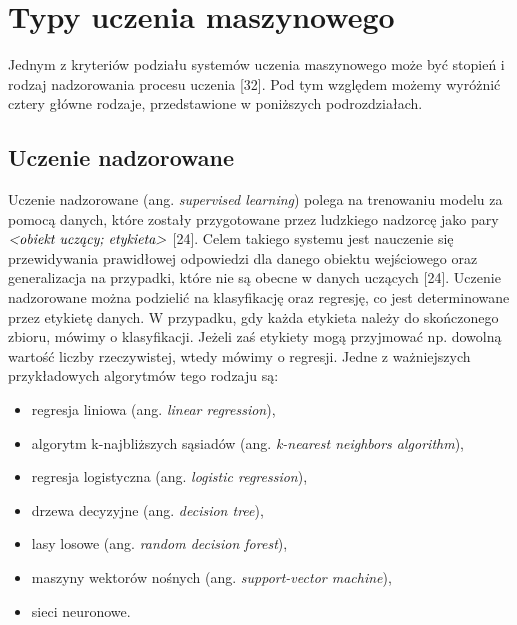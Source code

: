 \section{Typy uczenia maszynowego}
\label{cha:cha3.2}

Jednym z kryteriów podziału systemów uczenia maszynowego może być stopień i rodzaj nadzorowania procesu uczenia [32]. Pod tym względem możemy wyróżnić cztery główne rodzaje, przedstawione w poniższych podrozdziałach.

\subsection{Uczenie nadzorowane}
\label{cha:cha3.2.1}

Uczenie nadzorowane (ang. \textit{supervised learning}) polega na trenowaniu modelu za pomocą danych, które zostały przygotowane przez ludzkiego nadzorcę jako pary $\hbox{\it <obiekt~uczący; etykieta>}$ [24]. Celem takiego systemu jest nauczenie się przewidywania prawidłowej odpowiedzi dla danego obiektu wejściowego oraz generalizacja na przypadki, które nie są obecne w danych uczących [24]. 
Uczenie nadzorowane można podzielić na klasyfikację oraz regresję, co jest determinowane przez etykietę danych. W przypadku, gdy każda etykieta należy do skończonego zbioru, mówimy o klasyfikacji. Jeżeli zaś etykiety mogą przyjmować np. dowolną wartość liczby rzeczywistej, wtedy mówimy o regresji. Jedne z ważniejszych przykładowych algorytmów tego rodzaju są:
\begin{itemize}
\item
regresja liniowa (ang. \textit{linear regression}),

\item
algorytm k-najbliższych sąsiadów (ang. \textit{k-nearest neighbors algorithm}),

\item
regresja logistyczna (ang. \textit{logistic regression}),

\item
drzewa decyzyjne (ang. \textit{decision tree}),

\item
lasy losowe (ang. \textit{random decision forest}),

\item
maszyny wektorów nośnych (ang. \textit{support-vector machine}),

\item
sieci neuronowe.
\end{itemize}

